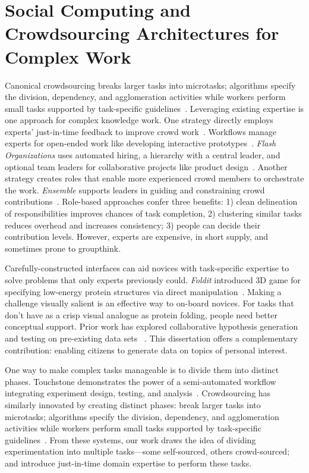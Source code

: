 \section{Social Computing and Crowdsourcing Architectures for Complex Work}
Canonical crowdsourcing breaks larger tasks into microtasks; algorithms specify the division,
dependency, and agglomeration activities while workers perform small tasks supported by task-specific
guidelines~\cite{kittur2012future}. Leveraging existing expertise is one approach for complex knowledge work. One strategy
directly employs experts’ just-in-time feedback to improve crowd work~\cite{dow2012shepherding}. Workflows manage
experts for open-ended work like developing interactive prototypes~\cite{Retelny2014}. 
\textit{Flash Organizations} uses automated hiring, a hierarchy with a central leader, and optional 
team leaders for collaborative projects like product design~\cite{Valentine2017}.
Another strategy creates roles that enable more experienced crowd members to orchestrate
the work. \textit{Ensemble} supports leaders in guiding and constraining crowd 
contributions~\cite{Kim2014e}. Role-based approaches confer three benefits: 1) clean 
delineation of responsibilities improves chances of task completion, 2) clustering similar tasks 
reduces overhead and increases consistency; 3) people can decide their contribution levels. 
However, experts are expensive, in short supply, and sometimes prone to groupthink. 

Carefully-constructed interfaces can aid novices with task-specific expertise to solve problems 
that only experts previously could. \textit{Foldit} introduced 3D game for specifying low-energy protein 
structures via direct manipulation~\cite{Cooper2010}. Making a challenge visually salient is an 
effective way to on-board novices. For tasks that don’t have as a crisp visual analogue as protein
folding, people need better conceptual support. Prior work has explored collaborative hypothesis generation and testing on pre-existing data sets
~\cite{luther2009pathfinder,willett2011commentspace}. This dissertation offers a 
complementary contribution: enabling citizens to generate data on topics of personal interest.

One way to make complex tasks manageable is to divide them into distinct phases. 
Touchstone demonstrates the power of a semi-automated workflow integrating experiment 
design, testing, and analysis~\cite{Mackay2007}. Crowdsourcing has similarly innovated by 
creating distinct phases: break larger tasks into microtasks; algorithms specify the division, 
dependency, and agglomeration activities while workers perform small tasks supported by 
task-specific guidelines~\cite{lasecki2012real}. From these systems, our work draws the 
idea of dividing experimentation into multiple tasks—some self-sourced, others 
crowd-sourced; and introduce just-in-time domain expertise to perform these tasks. 

